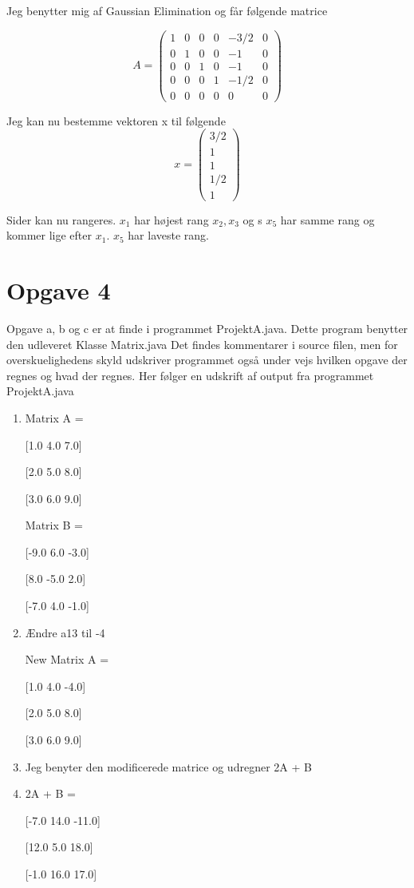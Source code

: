 \documentclass[12pt]{article}
\begin{document}
\begin{enumerate}[{a}]
Jeg benytter mig af Gaussian Elimination og får følgende matrice

$$A = \left(\begin{array}{ccccc|c}
1&0&0&0&-3/2&0
\\
0&1&0&0&-1&0
\\
0&0&1&0&-1&0
\\
0&0&0&1&-1/2&0\\
0&0&0&0&0&0
\end{array}\right)$$

Jeg kan nu bestemme vektoren x til følgende
$$x = \left(\begin{array}{c}
3/2\\1\\1\\1/2\\1
\end{array}\right)$$

Sider kan nu rangeres. $x_1$ har højest rang $x_2, x_3 $ og s
$ x_5$ har samme
rang og kommer lige efter $x_1$. $x_5$ har laveste rang.
\end{enumerate}

\section{Opgave 4}
Opgave a, b og c er at finde i programmet ProjektA.java. Dette program
benytter den udleveret Klasse Matrix.java
Det findes kommentarer i source filen, men for overskuelighedens skyld udskriver
programmet også under vejs hvilken opgave der regnes og hvad der regnes.
Her følger en udskrift af output fra programmet ProjektA.java
\begin{enumerate}[{a}]

\item
Matrix A = 

[1.0 4.0 7.0]

[2.0 5.0 8.0]

[3.0 6.0 9.0]

Matrix B = 

[-9.0 6.0 -3.0]

[8.0 -5.0 2.0]

[-7.0 4.0 -1.0]

\item

Ændre a13 til -4

New Matrix A = 

[1.0 4.0 -4.0]

[2.0 5.0 8.0]

[3.0 6.0 9.0]

\item
Jeg benyter den modificerede matrice og udregner 2A + B

\item 
2A + B =

[-7.0 14.0 -11.0]

[12.0 5.0 18.0]

[-1.0 16.0 17.0]
\end{enumerate}
\end{document}

